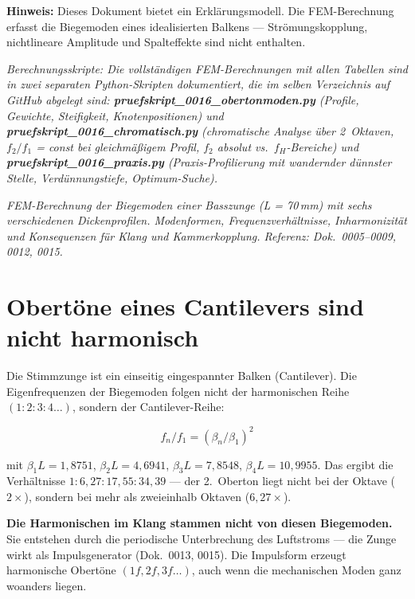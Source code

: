\documentclass[11pt,a4paper]{article}
\begin{document}
\hbmaketitle
\begin{tcolorbox}[colframe=red!60!black, colback=red!5!white]
\textbf{Hinweis:} Dieses Dokument bietet ein Erklärungsmodell.
Die FEM-Berechnung erfasst die Biegemoden eines idealisierten Balkens ---
Strömungskopplung, nichtlineare Amplitude und Spalteffekte sind nicht enthalten.
\end{tcolorbox}

\noindent\textit{\small Berechnungsskripte: Die vollständigen FEM-Berechnungen mit allen Tabellen
sind in zwei separaten Python-Skripten dokumentiert, die im selben Verzeichnis
auf GitHub abgelegt sind:
\textbf{pruefskript\_0016\_obertonmoden.py} (Profile, Gewichte, Steifigkeit, Knotenpositionen)
und \textbf{pruefskript\_0016\_chromatisch.py} (chromatische Analyse über 2~Oktaven,
$f_2/f_1$ = const bei gleichmäßigem Profil, $f_2$ absolut vs.\ $f_H$-Bereiche)
und \textbf{pruefskript\_0016\_praxis.py} (Praxis-Profilierung mit wandernder
dünnster Stelle, Verdünnungstiefe, Optimum-Suche).}

\noindent\textit{FEM-Berechnung der Biegemoden einer Basszunge (L = 70\,mm) mit
sechs verschiedenen Dickenprofilen. Modenformen, Frequenzverhältnisse,
Inharmonizität und Konsequenzen für Klang und Kammerkopplung.
Referenz: Dok.~0005--0009, 0012, 0015.}

\section{Obertöne eines Cantilevers sind nicht harmonisch}

Die Stimmzunge ist ein einseitig eingespannter Balken (Cantilever).
Die Eigenfrequenzen der Biegemoden folgen nicht der harmonischen Reihe
$(1:2:3:4\ldots)$, sondern der Cantilever-Reihe:

\begin{equation}
f_n / f_1 = (\beta_n / \beta_1)^2
\end{equation}

mit $\beta_1 L = 1{,}8751$, $\beta_2 L = 4{,}6941$, $\beta_3 L = 7{,}8548$,
$\beta_4 L = 10{,}9955$. Das ergibt die Verhältnisse $1 : 6{,}27 : 17{,}55 : 34{,}39$ ---
der 2.~Oberton liegt nicht bei der Oktave ($2\times$), sondern bei mehr als
zweieinhalb Oktaven ($6{,}27\times$).

\begin{tcolorbox}[colframe=keygreen, colback=green!5!white]
\textbf{Die Harmonischen im Klang stammen nicht von diesen Biegemoden.}
Sie entstehen durch die periodische Unterbrechung des Luftstroms --- die Zunge
wirkt als Impulsgenerator (Dok.~0013, 0015). Die Impulsform erzeugt harmonische
Obertöne $(1f, 2f, 3f\ldots)$, auch wenn die mechanischen Moden ganz woanders liegen.
\end{tcolorbox}
\end{document}
